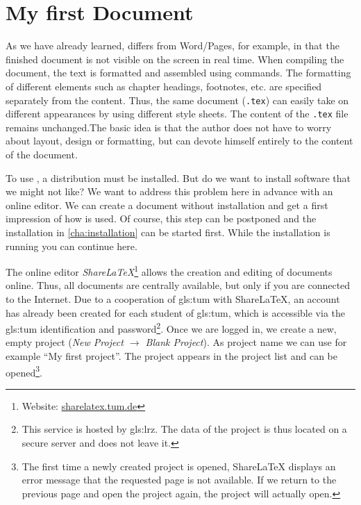 
\chapter{My first \Latex Document}
\label{cha:firstDocument}
As we have already learned, \Latex differs from Word/Pages, for example, in that the finished document is not visible on the screen in real time. When compiling the document, the text is formatted and assembled using commands. The formatting of different elements such as chapter headings, footnotes, etc. are specified separately from the content. Thus, the same \Latex document (\verb|.tex|) can easily take on different appearances by using different style sheets. The content of the \verb|.tex| file remains unchanged.The basic idea is that the author does not have to worry about layout, design or formatting, but can devote himself entirely to the content of the document.

To use \Latex, a \Latex distribution must be installed. But do we want to install software that we might not like? We want to address this problem here in advance with an online editor. We can create a document without installation and get a first impression of how \Latex is used. Of course, this step can be postponed and the installation in \autoref{cha:installation} can be started first. While the installation is running you can continue here.

The online editor \textit{ShareLaTeX}\footnote{Website: \href{sharelatex.tum.de}{sharelatex.tum.de}} allows the creation and editing of \Latex documents online. Thus, all documents are centrally available, but only if you are connected to the Internet. Due to a cooperation of \gls{gls:tum} with ShareLaTeX, an account has already been created for each student of \gls{gls:tum}, which is accessible via the \gls{gls:tum} identification and password\footnote{This service is hosted by \gls{gls:lrz}. The data of the project is thus located on a secure server and does not leave it.}. Once we are logged in, we create a new, empty project (\textit{New Project $\rightarrow$ Blank Project}). As project name we can use for example \enquote{My first project}. The project appears in the project list and can be opened\footnote{The first time a newly created project is opened, ShareLaTeX displays an error message that the requested page is not available. If we return to the previous page and open the project again, the project will actually open.}.

